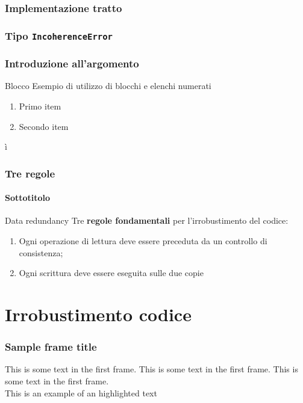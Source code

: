 \documentclass[aspectratio=169]{beamer}
\begin{document}
    \begin{frame}
        \frametitle{Implementazione tratto}
        \traitone
    \end{frame}

    \begin{frame}
        \frametitle{Tipo \texttt{IncoherenceError}}
        \incerror
    \end{frame}

        \begin{frame}
            \frametitle{Introduzione all'argomento}
            \begin{block}{Blocco}
                Esempio di utilizzo di blocchi e elenchi numerati
            \end{block}      
            \begin{enumerate}
                \item Primo item
                \item Secondo item
            \end{enumerate}
        \end{frame}

ì    \begin{frame}
        \frametitle{Tre regole}
        \framesubtitle{Sottotitolo}
        \begin{alertblock}{Data redundancy}
            Tre \textbf{regole fondamentali} per l'irrobustimento del codice: 
            \begin{enumerate}
                \item Ogni operazione di lettura deve essere preceduta da un controllo di consistenza;
                \item Ogni scrittura deve essere eseguita  sulle due copie
            \end{enumerate}
        \end{alertblock}
    \end{frame}

    

    \section{Irrobustimento codice}

    
    \begin{frame}
    \frametitle{Sample frame title}
    This is some text in the first frame. This is some text in the first frame. This is some text in the first frame.\\ \pause
    This is an example of an \alert{highlighted} text
    \end{frame}
\end{document}
